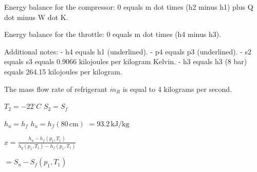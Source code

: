 Energy balance for the compressor:  
0 equals m dot times (h2 minus h1) plus Q dot minus W dot K.  

Energy balance for the throttle:  
0 equals m dot times (h4 minus h3).  

Additional notes:  
- h4 equals h1 (underlined).  
- p4 equals p3 (underlined).  
- s2 equals s3 equals 0.9066 kilojoules per kilogram Kelvin.  
- h3 equals h3 (8 bar) equals 264.15 kilojoules per kilogram.

The mass flow rate of refrigerant \( \dot{m}_R \) is equal to 4 kilograms per second.  

\( T_2 = -22^\circ C \)  
\( S_2 = S_f \)  

\( h_u = h_f \)  
\( h_u = h_f (80 \, \text{cm}) \)  
\( = 93.2 \, \text{kJ/kg} \)  

\( x = \frac{h_u - h_f (p_1, T_1)}{h_g (p_1, T_1) - h_f (p_1, T_1)} \)  

\( = S_u - S_f (p_1, T_1) \)
